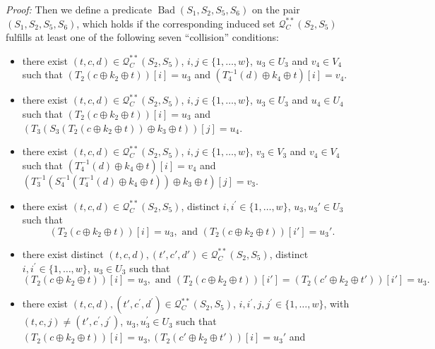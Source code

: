 \noindent \emph{Proof:} Then we define a predicate $\operatorname{Bad}\left(S_{1}, S_2, S_{5}, S_6\right)$ on the pair $(S_1,S_2, S_5, S_6)$, which holds if the corresponding induced set $\mathcal{Q}_{C}^{**}\left(S_{2}, S_{5}\right)$ fulfills at least one of the following seven ``collision'' conditions:

\begin{itemize}
  \item[\hone]
  there exist $(t, c, d) \in \mathcal{Q}_{C}^{**}\left(S_{2}, S_{5}\right)$, $i, j \in\{1, \ldots, w\}$, $u_{3} \in U_{3}$ and $v_{4} \in V_{4}$ such that $\left(T_2\left(c \oplus k_{2} \oplus t\right)\right)[i] = u_3$ and $\left(T_{4}^{-1}\left(d \right) \oplus k_{4} \oplus t\right)[i] = v_4$.
  \item[\htwo]
  there exist $(t, c, d) \in \mathcal{Q}_{C}^{**}\left(S_{2}, S_{5}\right)$, $i, j \in\{1, \ldots, w\}$, $u_{3} \in U_{3}$ and $u_{4} \in U_{4}$ such that $\left(T_2\left(c \oplus k_{2} \oplus t\right)\right)[i] = u_3$ and $\left(T_{3}\left(S_{3}\left(T_2\left(c \oplus k_{2} \oplus t\right)\right) \oplus k_{3} \oplus t\right)\right)[j] = u_4$.
  \item[\hthree]
  there exist $(t, c, d) \in \mathcal{Q}_{C}^{**}\left(S_{2}, S_{5}\right)$, $i, j \in\{1, \ldots, w\}$, $v_{3} \in V_{3}$ and $v_{4} \in V_{4}$ such that $\left(T_{4}^{-1}\left(d \right) \oplus k_{4} \oplus t\right)[i] = v_4$ and $\left(T_{3}^{-1}\left(S_{4}^{-1}\left(T_{4}^{-1}\left(d\right) \oplus k_{4} \oplus t\right)\right) \oplus k_{3} \oplus t\right)[j] = v_3$.
  \item[\hfour]
  there exist $(t, c, d) \in \mathcal{Q}_{C}^{**}\left(S_{2}, S_{5}\right)$, distinct $i, i^{\prime}\in\{1, \ldots, w\}$, $u_{3},u_{3}' \in U_{3}$ such that
  $$\left(T_2\left(c \oplus k_{2} \oplus t\right)\right)[i] = u_3,\text{ and }
  \left(T_2\left(c \oplus k_{2} \oplus t\right)\right)[i'] = u_3'.$$
  \item[\hfive]
  there exist distinct $(t, c, d),(t', c', d') \in \mathcal{Q}_{C}^{**}\left(S_{2}, S_{5}\right)$, distinct $i, i^{\prime}\in\{1, \ldots, w\}$, $u_{3} \in U_{3}$ such that
  $$\left(T_2\left(c \oplus k_{2} \oplus t\right)\right)[i] = u_3,\text{ and }
  \left(T_2\left(c \oplus k_{2} \oplus t\right)\right)[i'] =\left(T_2\left(c' \oplus k_{2} \oplus t'\right)\right)[i'] = u_3.$$
  \item[\hsix]
  there exist $(t, c, d), (t', c^{\prime}, d^{\prime}) \in \mathcal{Q}_{C}^{**}\left(S_{2}, S_{5}\right)$, $i, i^{\prime},j, j^{\prime} \in\{1, \ldots, w\}$, with$(t, c, j) \neq \left(t', c^{\prime}, j^{\prime}\right)$, $u_{3}, u_{3}^{\prime} \in U_{3}$ such that $\left(T_2\left(c \oplus k_{2} \oplus t\right)\right)[i] = u_3,\left(T_2\left(c' \oplus k_{2} \oplus t'\right)\right)[i] = u_3'$ and

\end{itemize}
